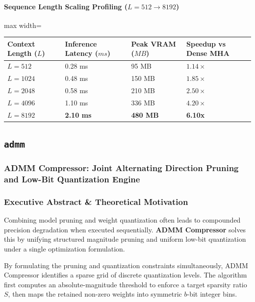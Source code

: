 \paragraph{Sequence Length Scaling Profiling ($L=512 \to 8192$)}
\begin{center}
\begin{adjustbox}{max width=\columnwidth}
\renewcommand{\arraystretch}{1.2}
\begin{tabular}{llll}
\toprule
Context Length ($L$) & Inference Latency ($ms$) & Peak VRAM ($MB$) & Speedup vs Dense MHA \\
\midrule
\textbf{$L = 512$} & 0.28 ms & 95 MB & $1.14\times$ \\
\textbf{$L = 1024$} & 0.48 ms & 150 MB & $1.85\times$ \\
\textbf{$L = 2048$} & 0.58 ms & 210 MB & $2.50\times$ \\
\textbf{$L = 4096$} & 1.10 ms & 336 MB & $4.20\times$ \\
\textbf{$L = 8192$} & \textbf{2.10 ms} & \textbf{480 MB} & \textbf{6.10x} \\


\bottomrule
\end{tabular}
\end{adjustbox}
\end{center}

\subsection{\texttt{admm}}
\subsubsection*{ADMM Compressor: Joint Alternating Direction Pruning and Low-Bit Quantization Engine}

\subsubsection*{Executive Abstract \& Theoretical Motivation}

Combining model pruning and weight quantization often leads to compounded precision degradation when executed sequentially. \textbf{ADMM Compressor} solves this by unifying structured magnitude pruning and uniform low-bit quantization under a single optimization formulation.

By formulating the pruning and quantization constraints simultaneously, ADMM Compressor identifies a sparse grid of discrete quantization levels. The algorithm first computes an absolute-magnitude threshold to enforce a target sparsity ratio $S$, then maps the retained non-zero weights into symmetric $b$-bit integer bins.

